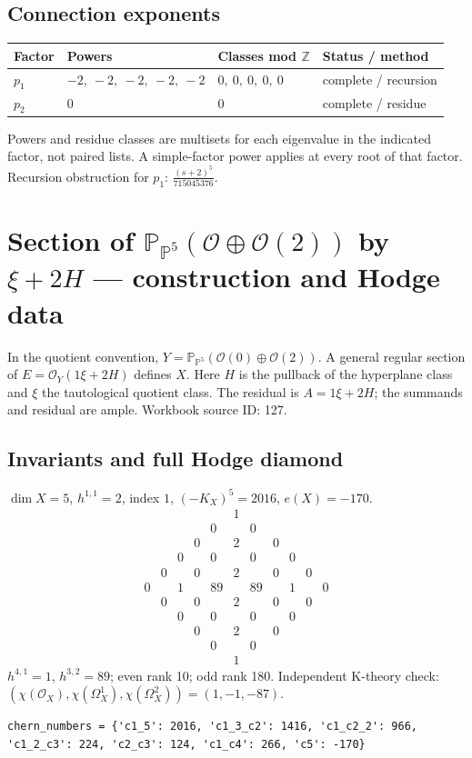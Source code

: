 \documentclass[10pt,a4paper]{article}
\begin{document}
\subsection*{Connection exponents}
\begin{center}\begin{tabular}{llll}\toprule Factor & Powers & Classes mod $\mathbb Z$ & Status / method\\\midrule
$p_{1}$ & $-2,\ -2,\ -2,\ -2,\ -2$ & $0,\ 0,\ 0,\ 0,\ 0$ & complete / recursion\\
$p_{2}$ & $0$ & $0$ & complete / residue\\
\bottomrule\end{tabular}\end{center}
Powers and residue classes are multisets for each eigenvalue in the indicated factor, not paired lists. A simple-factor power applies at every root of that factor.
Recursion obstruction for $p_{1}$: $\frac{\left(s + 2\right)^{5}}{715045376}$.
\clearpage\section*{Section of $\mathbb P_{\mathbb P^{5}}(\mathcal O\oplus \mathcal O(2))$ by $\xi +2H$ --- construction and Hodge data}\label{entry:PB5-127}
In the quotient convention, $Y=\mathbb P_{\mathbb P^{5}}(\mathcal O(0)\oplus\mathcal O(2))$.
A general regular section of $E=\mathcal O_Y(1\xi+2H)$ defines $X$.
Here $H$ is the pullback of the hyperplane class and $\xi$ the tautological quotient class. The residual is $A=1\xi+2H$; the summands and residual are ample.
Workbook source ID: 127.
\subsection*{Invariants and full Hodge diamond}
$\dim X=5$, $h^{1,1}=2$, index $1$, $(-K_X)^5=2016$, $e(X)=-170$.
\[\begin{array}{ccccccccccc}&&&&&1&&&&&\\&&&&0&&0&&&&\\&&&0&&2&&0&&&\\&&0&&0&&0&&0&&\\&0&&0&&2&&0&&0&\\0&&1&&89&&89&&1&&0\\&0&&0&&2&&0&&0&\\&&0&&0&&0&&0&&\\&&&0&&2&&0&&&\\&&&&0&&0&&&&\\&&&&&1&&&&&\end{array}\]
$h^{4,1}=1$, $h^{3,2}=89$; even rank 10; odd rank 180.
Independent K-theory check: $(\chi(\mathcal O_X),\chi(\Omega_X^1),\chi(\Omega_X^2))=(1, -1, -87)$.
\begin{lstlisting}
chern_numbers = {'c1_5': 2016, 'c1_3_c2': 1416, 'c1_c2_2': 966, 'c1_2_c3': 224, 'c2_c3': 124, 'c1_c4': 266, 'c5': -170}
\end{lstlisting}
\end{document}
